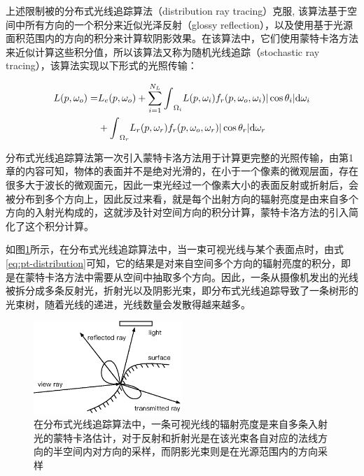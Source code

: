 上述限制被\cite{a:DistributedRayTracing}的分布式光线追踪算法（distribution ray tracing）克服, 该算法基于空间中所有方向的一个积分来近似光泽反射（glossy reflection），以及使用基于光源面积范围内的方向的积分来计算软阴影效果。在该算法中，它们使用蒙特卡洛方法来近似计算这些积分值，所以该算法又称为随机光线追踪（stochastic ray tracing），该算法实现以下形式的光照传输：

\begin{equation}
\begin{aligned}
	L(p,\omega_o)=&L_e(p, \omega_o)+\sum_{i=1}^{N_L}{\rm \int}_{\Omega_i}L(p,\omega_i) f_r(p,\omega_o,\omega_i)|\cos\theta_i|{\rm d}\omega_i\\
	&+{\rm \int}_{\Omega_r}L_r(p,\omega_r)f_r(p,\omega_o,\omega_r)|\cos\theta_r|{\rm d}\omega_r
\end{aligned}
\label{eq:pt-distribution}
\end{equation}

分布式光线追踪算法第一次引入蒙特卡洛方法用于计算更完整的光照传输，由第1章的内容可知，物体的表面并不是绝对光滑的，在小于一个像素的微观层面，存在很多大于波长的微观面元，因此一束光经过一个像素大小的表面反射或折射后，会被分布到多个方向上，因此反过来看，就是每个出射方向的辐射亮度是由来自多个方向的入射光构成的，这就涉及针对空间方向的积分计算，蒙特卡洛方法的引入简化了这个积分计算。

如图\ref{f:pt-distribution-ray-tracing}所示，在分布式光线追踪算法中，当一束可视光线与某个表面点时，由式\ref{eq:pt-distribution}可知，它的结果是对来自空间多个方向的辐射亮度的积分，即是在蒙特卡洛方法中需要从空间中抽取多个方向。因此，一条从摄像机发出的光线被拆分成多条反射光，折射光以及阴影光束，即分布式光线追踪导致了一条树形的光束树，随着光线的递进，光线数量会发散得越来越多。

\begin{figure}
\sidecaption
	\includegraphics[width=0.5\textwidth]{figures/pt/distribution}
	\caption{在分布式光线追踪算法中，一条可视光线的辐射亮度是来自多条入射光的蒙特卡洛估计，对于反射和折射光是在该光束各自对应的法线方向的半空间内对方向的采样，而阴影光束则是在光源范围内的方向采样}
	\label{f:pt-distribution-ray-tracing}
\end{figure}

